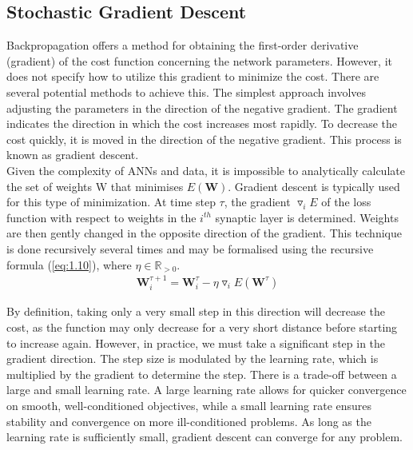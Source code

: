 \subsection[Stochastic Gradient Descent]{Stochastic Gradient Descent}

Backpropagation offers a method for obtaining the first-order derivative (gradient) of the cost function concerning the network parameters. However, it does not specify how to utilize this gradient to minimize the cost. There are several potential methods to achieve this. The simplest approach involves adjusting the parameters in the direction of the negative gradient. The gradient indicates the direction in which the cost increases most rapidly. To decrease the cost quickly, it is moved in the direction of the negative gradient. This process is known as gradient descent. \\

\noindent Given the complexity of ANNs and data, it is impossible to analytically calculate the set of weights W that minimises $E(\mathbf{W})$. Gradient descent is typically used for this type of minimization. At time step $\tau$, the gradient $\triangledown_i E$ of the loss function with respect to weights in the $i^{th}$ synaptic layer is determined. Weights are then gently changed in the opposite direction of the gradient. This technique is done recursively several times and may be formalised using the recursive formula (\ref{eq:1.10}), where $\eta \in \mathbb{R}_{>0}$.
\begin{align}
    \mathbf{W}_{i}^{\tau + 1} = \mathbf{W}_{i}^{\tau} - \eta \triangledown_i E \left ( \mathbf{W}^{\tau} \right ) \label{eq:1.10}
\end{align}

\noindent By definition, taking only a very small step in this direction will decrease the cost, as the function may only decrease for a very short distance before starting to increase again. However, in practice, we must take a significant step in the gradient direction. The step size is modulated by the learning rate, which is multiplied by the gradient to determine the step. There is a trade-off between a large and small learning rate. A large learning rate allows for quicker convergence on smooth, well-conditioned objectives, while a small learning rate ensures stability and convergence on more ill-conditioned problems. As long as the learning rate is sufficiently small, gradient descent can converge for any problem. \\

